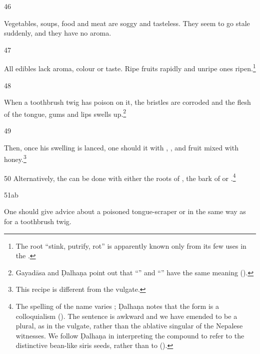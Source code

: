 \begin{translation}
\item[46]

Vegetables, soups, food and meat are soggy and tasteless.  They seem to go stale
suddenly, and they have no aroma.  

\item[47] 

All edibles lack aroma, colour or taste.  Ripe fruits rapidly  and unripe ones ripen.\footnote{The root \root{} “stink, 
    putrify, rot” 
    is apparently known only from its few uses in the \SS.}

\item[48]

When a toothbrush twig has poison on it, the bristles are corroded and the
flesh of the tongue, gums and lips swells up.\footnote{Gayadāsa and Ḍalhaṇa 
point out that “” and 
“” have the same meaning 
().}

\item[49]

 Then, once his swelling is 
 lanced, one should  it with
 ,
 ,
  and
 fruit mixed with honey.\footnote{This recipe is different from the vulgate.}
 
 \item[50] Alternatively, the  can be done with either
 the roots of , the bark
of  or .\footnote{The 
    spelling of
the name  varies  
\citep[5]{sing-1972};
Ḍalhaṇa notes that the form   is a colloquialism
().  The sentence is awkward and we have emended
 to be a plural, as in the vulgate, rather than the ablative 
singular of 
the Nepalese witnesses.  We follow Ḍalhaṇa in interpreting the compound to refer 
to the distinctive bean-like siris seeds, rather than to  ().}

\item[51ab] 
 
One should give advice about a poisoned tongue-scraper or 
 in the
same way as  for a toothbrush twig.


\end{translation}
